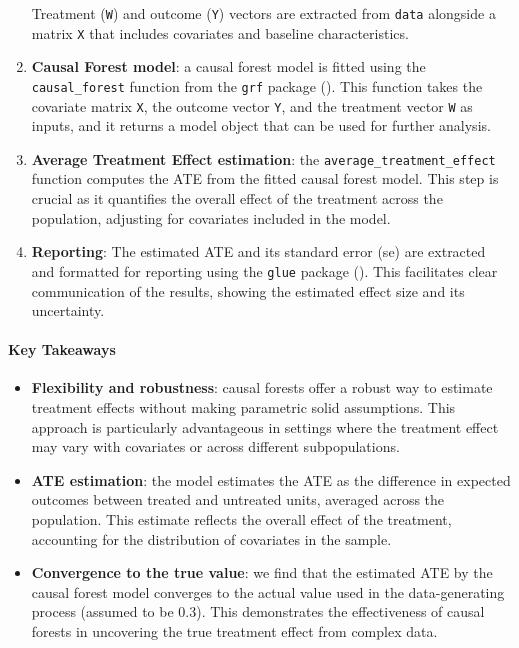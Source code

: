 \documentclass[
  singlecolumn]{article}
\let\oldparagraph\paragraph
\renewcommand{\paragraph}[1]{\oldparagraph{#1}\mbox{}}
\begin{document}
\begin{enumerate}
  Treatment (\texttt{W}) and outcome (\texttt{Y}) vectors are extracted
  from \texttt{data} alongside a matrix \texttt{X} that includes
  covariates and baseline characteristics.
\item
  \textbf{Causal Forest model}: a causal forest model is fitted using
  the \texttt{causal\_forest} function from the \texttt{grf} package
  (). This function
  takes the covariate matrix \texttt{X}, the outcome vector \texttt{Y},
  and the treatment vector \texttt{W} as inputs, and it returns a model
  object that can be used for further analysis.
\item
  \textbf{Average Treatment Effect estimation}: the
  \texttt{average\_treatment\_effect} function computes the ATE from the
  fitted causal forest model. This step is crucial as it quantifies the
  overall effect of the treatment across the population, adjusting for
  covariates included in the model.
\item
  \textbf{Reporting}: The estimated ATE and its standard error (se) are
  extracted and formatted for reporting using the \texttt{glue} package
  (). This
  facilitates clear communication of the results, showing the estimated
  effect size and its uncertainty.
\end{enumerate}

\paragraph{Key Takeaways}\label{key-takeaways}

\begin{itemize}
\item
  \textbf{Flexibility and robustness}: causal forests offer a robust way
  to estimate treatment effects without making parametric solid
  assumptions. This approach is particularly advantageous in settings
  where the treatment effect may vary with covariates or across
  different subpopulations.
\item
  \textbf{ATE estimation}: the model estimates the ATE as the difference
  in expected outcomes between treated and untreated units, averaged
  across the population. This estimate reflects the overall effect of
  the treatment, accounting for the distribution of covariates in the
  sample.
\item
  \textbf{Convergence to the true value}: we find that the estimated ATE
  by the causal forest model converges to the actual value used in the
  data-generating process (assumed to be 0.3). This demonstrates the
  effectiveness of causal forests in uncovering the true treatment
  effect from complex data.
\end{itemize}
\end{document}
